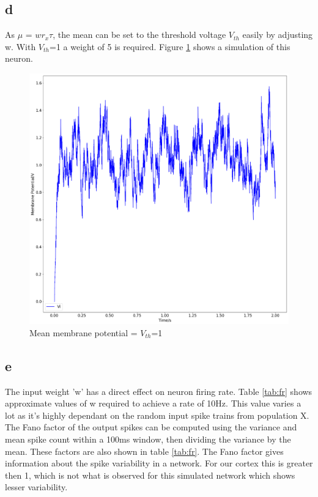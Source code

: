 \documentclass[twoside,twocolumn]{article}
\begin{document}
\subsection{d}
As $\mu$ = $wr_x\tau$, the mean can be set to the threshold voltage $V_{th}$ easily by adjusting w. With $V_{th}$=1 a weight of 5 is required. Figure \ref{fig:3d} shows a simulation of this neuron.
\begin{figure}[h]
  \centering
    \includegraphics[width=\linewidth]{3d}
  \caption{Mean membrane potential = $V_{th}$=1}
  \label{fig:3d}
\end{figure}


\subsection{e}
The input weight 'w' has a direct effect on neuron firing rate. Table \ref{tab:fr} shows approximate values of w required to achieve a rate of 10Hz. This value varies a lot as it's highly dependant on the random input spike trains from population X. The Fano factor of the output spikes can be computed using the variance and mean spike count within a 100ms window, then dividing the variance by the mean. These factors are also shown in table \ref{tab:fr}. The Fano factor gives information about the spike variability in a network. For our cortex this is greater then 1, which is not what is observed for this simulated network which shows lesser variability. 
\end{document}
